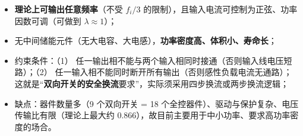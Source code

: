 \begin{itemize}
  \item \textbf{理论上可输出任意频率}（不受 $f_i/3$ 的限制），且输入电流可控制为正弦、功率因数可调（可做到 $\lambda\approx1$）；
  \item 无中间储能元件（无大电容、大电感），\textbf{功率密度高、体积小、寿命长}；
  \item 约束条件：（1） 任一输出相不能与两个输入相同时接通（否则输入线电压短路）；（2） 任一输入相不能同时断开所有输出（否则感性负载电流无通路）；这就是“\textbf{双向开关的安全换流}要求”，实际须采用四步换流或两步换流逻辑；
  \item 缺点：器件数量多（9 个双向开关 = 18 个全控器件）、驱动与保护复杂、电压传输比有限（理论上最大约 0.866），故目前主要用于中小功率、要求高功率密度的场合。
\end{itemize}

